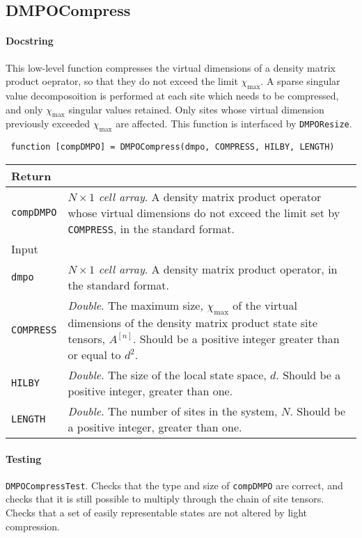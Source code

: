  \subsection{DMPOCompress}
 \paragraph{Docstring} This low-level function compresses the virtual dimensions of a density matrix product oeprator, so that they do not exceed the limit \(\chi_{\mathrm{max}}\). A sparse singular value decomposoition is performed at each site which needs to be compressed, and only \(\chi_{\mathrm{max}}\) singular values retained. Only sites whose virtual dimension previously exceeded \(\chi_{\mathrm{max}}\) are affected. This function is interfaced by \lstinline$DMPOResize$.
 \begin{lstlisting}
 function [compDMPO] = DMPOCompress(dmpo, COMPRESS, HILBY, LENGTH) \end{lstlisting}
 \begin{longtabu}{X[1,l]X[4,l]}
 \hline
 Return & \\ \hline
 \lstinline$compDMPO$ & \emph{\(N \times 1\) cell array}. A density matrix product operator whose virtual dimensions do not exceed the limit set by \lstinline$COMPRESS$, in the standard format. \\ \hline
 Input & \\ \hline
 \lstinline$dmpo$ & \emph{\(N \times 1\) cell array}. A density matrix product operator, in the standard format. \\
 \lstinline$COMPRESS$ & \emph{Double}. The maximum size, \(\chi_{\mathrm{max}}\) of the virtual dimensions of the density matrix product state site tensors, \(A^{[n]}\). Should be a positive integer greater than or equal to \(d^{2}\). \\
 \lstinline$HILBY$ & \emph{Double}. The size of the local state space, \(d\). Should be a positive integer, greater than one. \\
 \lstinline$LENGTH$ & \emph{Double}. The number of sites in the system, \(N\). Should be a positive integer, greater than one. \\ 
 \hline
 \end{longtabu}
 \paragraph{Testing} \lstinline$DMPOCompressTest$. Checks that the type and size of \lstinline$compDMPO$ are correct, and checks that it is still possible to multiply through the chain of site tensors. Checks that a set of easily representable states are not altered by light compression.
 
